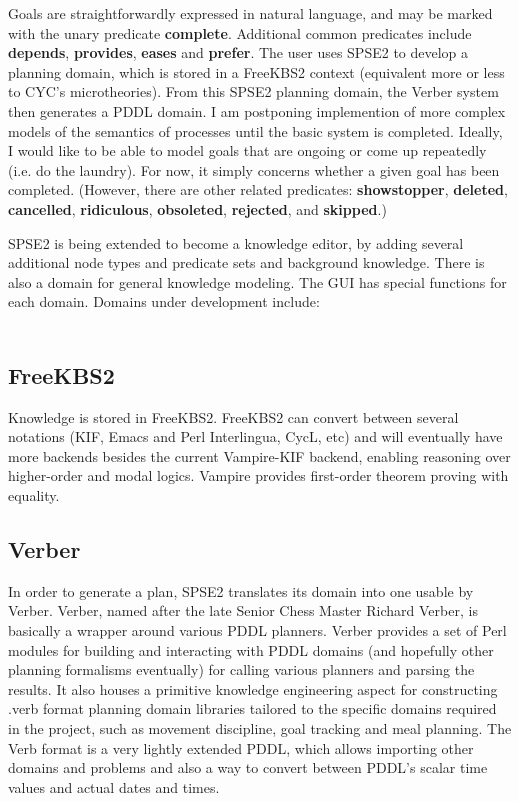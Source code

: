 \documentclass[letterpaper]{article}
\begin{document}
Goals are straightforwardly expressed in natural language, and may be
marked with the unary predicate {\bf complete}.  Additional common
predicates include {\bf depends}, {\bf provides}, {\bf eases} and {\bf
  prefer}.  The user uses SPSE2 to develop a planning domain, which is
stored in a FreeKBS2 context (equivalent more or less to CYC's
microtheories).  From this SPSE2 planning domain, the Verber system
then generates a PDDL domain.  I am postponing implemention of more
complex models of the semantics of processes until the basic system is
completed.  Ideally, I would like to be able to model goals that are
ongoing or come up repeatedly (i.e. do the laundry).  For now, it
simply concerns whether a given goal has been completed.  (However,
there are other related predicates: {\bf showstopper}, {\bf deleted},
{\bf cancelled}, {\bf ridiculous}, {\bf obsoleted}, {\bf rejected},
and {\bf skipped}.)

SPSE2 is being extended to become a knowledge editor, by adding
several additional node types and predicate sets and background
knowledge.  There is also a domain for general knowledge modeling.
The GUI has special functions for each domain.  Domains under
development include:\\

\\

\subsection{FreeKBS2}

Knowledge is stored in FreeKBS2.  FreeKBS2 can convert between several
notations (KIF, Emacs and Perl Interlingua, CycL, etc) and will
eventually have more backends besides the current Vampire-KIF backend,
enabling reasoning over higher-order and modal logics.  Vampire
provides first-order theorem proving with equality.

\subsection{Verber}

In order to generate a plan, SPSE2 translates its domain into one
usable by Verber.  Verber, named after the late Senior Chess Master
Richard Verber, is basically a wrapper around various PDDL planners.
Verber provides a set of Perl modules for building and interacting
with PDDL domains (and hopefully other planning formalisms eventually)
for calling various planners and parsing the results.  It also houses
a primitive knowledge engineering aspect for constructing .verb format
planning domain libraries tailored to the specific domains required in
the project, such as movement discipline, goal tracking and meal
planning.  The Verb format is a very lightly extended PDDL, which
allows importing other domains and problems and also a way to convert
between PDDL's scalar time values and actual dates and times.
\end{document}
